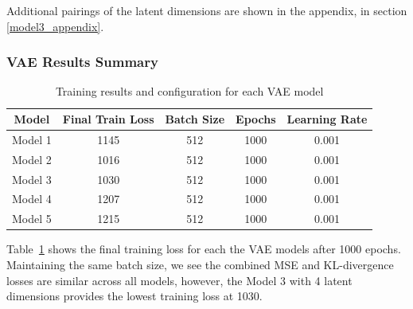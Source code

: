 \documentclass{article}
\begin{document}
Additional pairings of the latent dimensions are shown in the appendix, in section \ref{model3_appendix}.

\subsubsection{VAE Results Summary}

\begin{table}[h]
\centering
\begin{tabular}{|c|c|c|c|c|}
\hline
\textbf{Model} & \textbf{Final Train Loss} & \textbf{Batch Size} & \textbf{Epochs} & \textbf{Learning Rate} \\
\hline
Model 1 & 1145 & 512 & 1000 & 0.001 \\
\hline
Model 2 & 1016 & 512 & 1000 & 0.001 \\
\hline
Model 3 & 1030 & 512 & 1000 & 0.001 \\
\hline
Model 4 & 1207 & 512 & 1000 & 0.001 \\
\hline
Model 5 & 1215 & 512 & 1000 & 0.001 \\
\hline
\end{tabular}
\caption{Training results and configuration for each VAE model}
\label{tab:GA_models_results}
\end{table}

Table~\ref{tab:GA_models_results} shows the final training loss for each the VAE models after 1000 epochs. Maintaining the same batch size, we see the combined MSE and KL-divergence losses are similar across all models, however, the Model 3 with 4 latent dimensions provides the lowest training loss at 1030.
\end{document}
